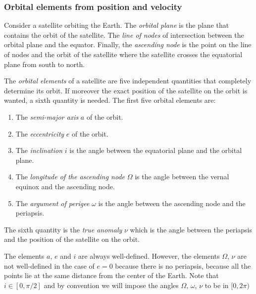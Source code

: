 \documentclass[../main.tex]{subfiles}
\begin{document}
\subsubsection{Orbital elements from position and velocity}
\begin{definition}
  Consider a satellite orbiting the Earth. The \emph{orbital plane} is the plane that contains the orbit of the satellite. The \emph{line of nodes} of intersection between the orbital plane and the equator. Finally, the \emph{ascending node} is the point on the line of nodes and the orbit of the satellite where the satellite crosses the equatorial plane from south to north.
\end{definition}
\begin{definition}
  The \emph{orbital elements} of a satellite are five independent quantities that completely determine its orbit. If moreover the exact position of the satellite on the orbit is wanted, a sixth quantity is needed. The first five orbital elements are:
  \begin{enumerate}
    \item The \emph{semi-major axis} $a$ of the orbit.
    \item The \emph{eccentricity} $e$ of the orbit.
    \item The \emph{inclination} $i$ is the angle between the equatorial plane and the orbital plane.
    \item The \emph{longitude of the ascending node} $\Omega$ is the angle between the vernal equinox and the ascending node.
    \item The \emph{argument of perigee} $\omega$ is the angle between the ascending node and the periapsis.
  \end{enumerate}
  The sixth quantity is the \emph{true anomaly} $\nu$ which is the angle between the periapsis and the position of the satellite on the orbit.
\end{definition}
The elements $a$, $e$ and $i$ are always well-defined. However, the elements $\Omega$, $\nu$ are not well-defined in the case of $e=0$ because there is no periapsis, because all the points lie at the same distance from the center of the Earth.
Note that $i\in [0,\pi/2]$ and by convention we will impose the angles  $\Omega$, $\omega$, $\nu$ to be in  $[0,2\pi)$
\end{document}
